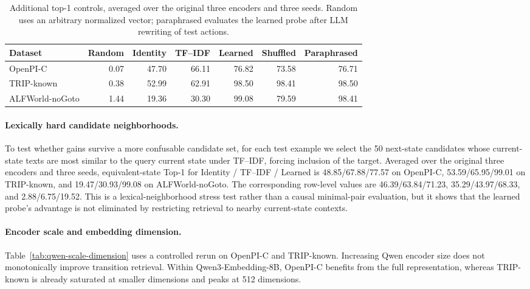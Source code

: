\documentclass{article}
\begin{document}
\begin{table}[h]
  \centering
  \caption{Additional top-1 controls, averaged over the original three encoders and three seeds. Random uses an arbitrary normalized vector; paraphrased evaluates the learned probe after LLM rewriting of test actions.}
  \label{tab:reviewer-controls}
  \small
  \setlength{\tabcolsep}{3.5pt}
  \begin{tabular}{lrrrrrr}
    \toprule
    Dataset & Random & Identity & TF--IDF & Learned & Shuffled & Paraphrased \\
    \midrule
    OpenPI-C & 0.07 & 47.70 & 66.11 & 76.82 & 73.58 & 76.71 \\
    TRIP-known & 0.38 & 52.99 & 62.91 & 98.50 & 98.41 & 98.50 \\
    ALFWorld-noGoto & 1.44 & 19.36 & 30.30 & 99.08 & 79.59 & 98.41 \\
    \bottomrule
  \end{tabular}
\end{table}

\paragraph{Lexically hard candidate neighborhoods.}
To test whether gains survive a more confusable candidate set, for each test example we select the 50 next-state candidates whose current-state texts are most similar to the query current state under TF--IDF, forcing inclusion of the target. Averaged over the original three encoders and three seeds, equivalent-state Top-1 for Identity / TF--IDF / Learned is 48.85/67.88/77.57 on OpenPI-C, 53.59/65.95/99.01 on TRIP-known, and 19.47/30.93/99.08 on ALFWorld-noGoto. The corresponding row-level values are 46.39/63.84/71.23, 35.29/43.97/68.33, and 2.88/6.75/19.52. This is a lexical-neighborhood stress test rather than a causal minimal-pair evaluation, but it shows that the learned probe's advantage is not eliminated by restricting retrieval to nearby current-state contexts.

\paragraph{Encoder scale and embedding dimension.}
Table~\ref{tab:qwen-scale-dimension} uses a controlled rerun on OpenPI-C and TRIP-known. Increasing Qwen encoder size does not monotonically improve transition retrieval. Within Qwen3-Embedding-8B, OpenPI-C benefits from the full representation, whereas TRIP-known is already saturated at smaller dimensions and peaks at 512 dimensions.
\end{document}
